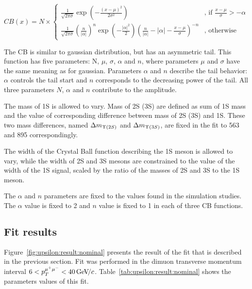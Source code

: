 \begin{equation}
CB(x) = N \times
\begin{cases}
\frac{1}{\sqrt{2\pi\sigma}}\exp(-\frac{(x-\mu)^2}{2\sigma^2}) & \text{, if $\frac{x-\mu}{\sigma} > -\alpha$} \\
\frac{1}{\sqrt{2\pi\sigma}}(\frac{n}{|\alpha|})^n \exp(-\frac{|\alpha|^2}{2})(\frac{n}{|\alpha|}-|\alpha|-\frac{x-\mu}{\sigma})^{-n} & \text{, otherwise}
\end{cases}
\label{eq:cb}
\end{equation}

The CB is similar to gaussian distribution, but has an asymmetric tail. This
function has five parameters: N, $\mu$, $\sigma$, $\alpha$ and $n$, where
parameters $\mu$ and $\sigma$ have the same meaning as for gaussian. Parameters
$\alpha$ and $n$ describe the tail behavior: $\alpha$ controls the tail start
and $n$ corresponds to the decreasing power of the tail. All three parameters
$N$, $\alpha$ and $n$ contribute to the amplitude.

The mass of \Y1S is allowed to vary. Mass of \Y2S (\Y3S) are defined as sum of
\Y1S mass and the value of corresponding difference between mass of
\Y2S (\Y3S) and \Y1S. These two mass differences, named $\Delta m_{\Y2S}$ and
$\Delta m_{\Y3S}$, are fixed in the fit to 563 \mevcc and 895 \mevcc
correspondingly.

The width of the Crystal Ball function describing the \Y1S meson is allowed to
vary, while the width of \Y2S and \Y3S mesons are constrained to the value of
the width of the \Y1S signal, scaled by the ratio of the masses of \Y2S and \Y3S
to the \Y1S meson.

The  $\alpha$ and $n$ parameters are fixed to the values found in
the simulation studies.
The $\alpha$ value is fixed to 2 and $n$ value is fixed to 1 in each of three
CB functions.

\subsection{Fit results}
\label{sec:upsilon:result}

Figure~\ref{fig:upsilon:result:nominal} presents the result of the fit that is
described in the previous section. Fit was performed in the dimuon
transverse momentum interval $ 6 < p_T^{\mu^+\mu^-} < 40 {\mathrm{\,Ge\kern -0.1em V\!/}c}$.
Table~\ref{tab:upsilon:result:nominal} shows the parameters values of this fit.

